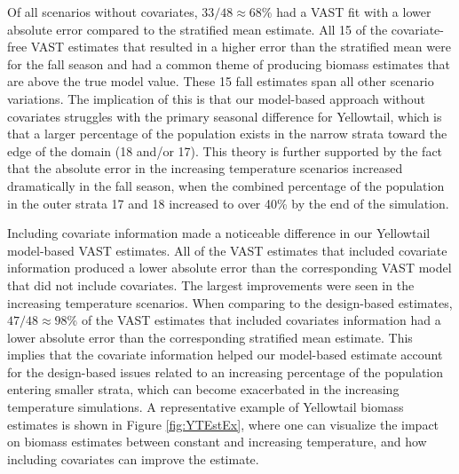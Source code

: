 \documentclass[
  12pt,
]{article}
\begin{document}
Of all scenarios without covariates, \(33/48\approx68\)\% had a VAST fit with a lower absolute error compared to the stratified mean estimate. All 15 of the covariate-free VAST estimates that resulted in a higher error than the stratified mean were for the fall season and had a common theme of producing biomass estimates that are above the true model value. These 15 fall estimates span all other scenario variations. The implication of this is that our model-based approach without covariates struggles with the primary seasonal difference for Yellowtail, which is that a larger percentage of the population exists in the narrow strata toward the edge of the domain (18 and/or 17). This theory is further supported by the fact that the absolute error in the increasing temperature scenarios increased dramatically in the fall season, when the combined percentage of the population in the outer strata 17 and 18 increased to over 40\% by the end of the simulation.

Including covariate information made a noticeable difference in our Yellowtail model-based VAST estimates. All of the VAST estimates that included covariate information produced a lower absolute error than the corresponding VAST model that did not include covariates. The largest improvements were seen in the increasing temperature scenarios. When comparing to the design-based estimates, \(47/48\approx98\)\% of the VAST estimates that included covariates information had a lower absolute error than the corresponding stratified mean estimate. This implies that the covariate information helped our model-based estimate account for the design-based issues related to an increasing percentage of the population entering smaller strata, which can become exacerbated in the increasing temperature simulations. A representative example of Yellowtail biomass estimates is shown in Figure \ref{fig:YTEstEx}, where one can visualize the impact on biomass estimates between constant and increasing temperature, and how including covariates can improve the estimate.
\end{document}
